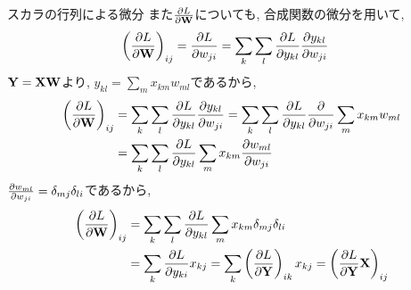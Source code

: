 \documentclass[dvipdfmx,notheorems,t]{beamer}
\begin{document}
\begin{frame}{スカラの行列による微分}
また$\pdv{L}{\vb{W}}$についても, 合成関数の微分を用いて,
\begin{align*}
  \left( \pdv{L}{\vb{W}} \right)_{ij} &= \pdv{L}{w_{ji}}
    = \sum_k \sum_l \pdv{L}{y_{kl}} \pdv{y_{kl}}{w_{ji}}
\end{align*}
$\vb{Y} = \vb{X} \vb{W}$より, $y_{kl} = \sum_m x_{km} w_{ml}$であるから,
\begin{align*}
  \left( \pdv{L}{\vb{W}} \right)_{ij}
    &= \sum_k \sum_l \pdv{L}{y_{kl}} \pdv{y_{kl}}{w_{ji}}
    = \sum_k \sum_l \pdv{L}{y_{kl}} \pdv{w_{ji}} \sum_m x_{km} w_{ml} \\
    &= \sum_k \sum_l \pdv{L}{y_{kl}} \sum_m x_{km} \pdv{w_{ml}}{w_{ji}}
\end{align*}
$\pdv{w_{ml}}{w_{ji}} = \delta_{mj} \delta_{li}$であるから,
\begin{align*}
  \left( \pdv{L}{\vb{W}} \right)_{ij}
    &= \sum_k \sum_l \pdv{L}{y_{kl}} \sum_m x_{km} \delta_{mj} \delta_{li} \\
    &= \sum_k \pdv{L}{y_{ki}} x_{kj}
    = \sum_k \left( \pdv{L}{\vb{Y}} \right)_{ik} x_{kj}
    = \left( \pdv{L}{\vb{Y}} \vb{X} \right)_{ij}
\end{align*}
\end{frame}

\end{document}
